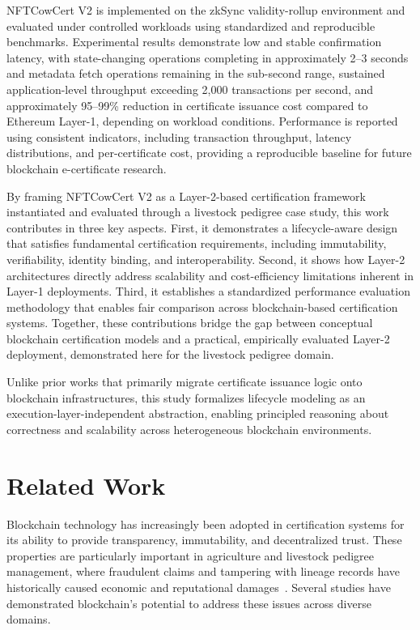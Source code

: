 \documentclass[pdflatex,sn-mathphys-num]{sn-jnl}
\begin{document}
NFTCowCert V2 is implemented on the zkSync validity-rollup environment and evaluated under controlled workloads using standardized and reproducible benchmarks. Experimental results demonstrate low and stable confirmation latency, with state-changing operations completing in approximately 2--3 seconds and metadata fetch operations remaining in the sub-second range, sustained application-level throughput exceeding 2{,}000 transactions per second, and approximately 95--99\% reduction in certificate issuance cost compared to Ethereum Layer-1, depending on workload conditions. Performance is reported using consistent indicators, including transaction throughput, latency distributions, and per-certificate cost, providing a reproducible baseline for future blockchain e-certificate research.

By framing NFTCowCert V2 as a Layer-2-based certification framework instantiated and evaluated through a livestock pedigree case study, this work contributes in three key aspects. First, it demonstrates a lifecycle-aware design that satisfies fundamental certification requirements, including immutability, verifiability, identity binding, and interoperability. Second, it shows how Layer-2 architectures directly address scalability and cost-efficiency limitations inherent in Layer-1 deployments. Third, it establishes a standardized performance evaluation methodology that enables fair comparison across blockchain-based certification systems. Together, these contributions bridge the gap between conceptual blockchain certification models and a practical, empirically evaluated Layer-2 deployment, demonstrated here for the livestock pedigree domain.

Unlike prior works that primarily migrate certificate issuance logic onto blockchain infrastructures, this study formalizes lifecycle modeling as an execution-layer-independent abstraction, enabling principled reasoning about correctness and scalability across heterogeneous blockchain environments.

\section{Related Work}
Blockchain technology has increasingly been adopted in certification systems for its ability to provide transparency, immutability, and decentralized trust. These properties are particularly important in agriculture and livestock pedigree management, where fraudulent claims and tampering with lineage records have historically caused economic and reputational damages~\cite{cheng2018blockchain,hawashin2024blockchain}. Several studies have demonstrated blockchain’s potential to address these issues across diverse domains.
\end{document}
